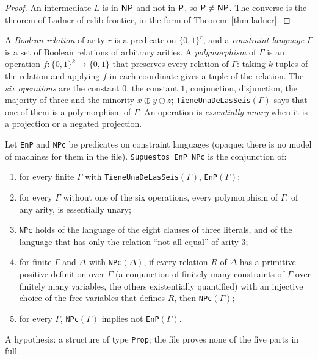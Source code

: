 \begin{proof}
  \leanok
  An intermediate $L$ is in $\mathsf{NP}$ and not in $\mathsf{P}$, so $\mathsf{P} \neq \mathsf{NP}$. The converse is the theorem
  of Ladner of cslib-frontier, in the form of Theorem~\ref{thm:ladner}.
\end{proof}

A \emph{Boolean relation} of arity $r$ is a predicate on $\{0,1\}^r$, and a \emph{constraint
language} $\Gamma$ is a set of Boolean relations of arbitrary arities. A \emph{polymorphism} of
$\Gamma$ is an operation $f : \{0,1\}^k \to \{0,1\}$ that preserves every relation of $\Gamma$: taking
$k$ tuples of the relation and applying $f$ in each coordinate gives a tuple of the relation. The
\emph{six operations} are the constant $0$, the constant $1$, conjunction, disjunction, the majority
of three and the minority $x \oplus y \oplus z$; \texttt{TieneUnaDeLasSeis}$(\Gamma)$ says that one
of them is a polymorphism of $\Gamma$. An operation is \emph{essentially unary} when it is a
projection or a negated projection.

\begin{definition}
  \label{def:arrow-dichotomy-assumptions}
  \leanok
  Let \texttt{EnP} and \texttt{NPc} be predicates on constraint languages (opaque: there is no model
  of machines for them in the file). \texttt{Supuestos EnP NPc} is the conjunction of:
  \begin{enumerate}
    \item for every finite $\Gamma$ with \texttt{TieneUnaDeLasSeis}$(\Gamma)$, \texttt{EnP}$(\Gamma)$;
    \item for every $\Gamma$ without one of the six operations, every polymorphism of $\Gamma$, of any
      arity, is essentially unary;
    \item \texttt{NPc} holds of the language of the eight clauses of three literals, and of the
      language that has only the relation ``not all equal'' of arity $3$;
    \item for finite $\Gamma$ and $\Delta$ with \texttt{NPc}$(\Delta)$, if every relation $R$ of
      $\Delta$ has a primitive positive definition over $\Gamma$ (a conjunction of finitely many
      constraints of $\Gamma$ over finitely many variables, the others existentially quantified) with
      an injective choice of the free variables that defines $R$, then \texttt{NPc}$(\Gamma)$;
    \item for every $\Gamma$, \texttt{NPc}$(\Gamma)$ implies not \texttt{EnP}$(\Gamma)$.
  \end{enumerate}
  A hypothesis: a structure of type \texttt{Prop}; the file proves none of the five parts in full.
  \own{}
\end{definition}

